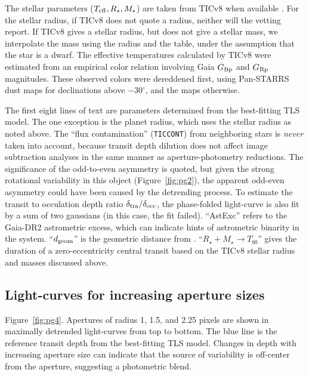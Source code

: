 \documentclass[12pt,twocolumn,tighten]{aastex62}
\begin{document}
The stellar parameters ($T_{\rm eff}, R_\star, M_\star$) are taken
from TICv8 when available \citep{stassun_TIC8_2019}.  For the stellar
radius, if TICv8 does not quote a radius, neither will the vetting
report.  If TICv8 gives a stellar radius, but does not give
a stellar mass, we interpolate the mass using the radius and the 
\citet{pecaut_intrinsic_2013}
table, under the assumption that the star is a dwarf.
The effective temperatures calculated by TICv8 were estimated from an empirical
color relation involving Gaia $G_{\rm Bp}$ and $G_{\rm Rp}$ magnitudes.  These
observed colors were dereddened first, using Pan-STARRS dust maps
\citep{green_galactic_2018} for declinations above $-30^\circ$, and the
\citet{schlegel_maps_1998} maps otherwise.

The first eight lines of text are parameters determined from the
best-fitting TLS model.  The one exception is the planet radius, which
uses the stellar radius as noted above.  The ``flux contamination''
(\texttt{TICCONT}) from neighboring stars is {\it never} taken into
account, because transit depth dilution does not affect image
subtraction analyses in the same manner as aperture-photometry
reductions.  The significance of the odd-to-even asymmetry is quoted,
but given the strong rotational variability in this object
(Figure~\ref{fig:pg2}), the apparent odd-even asymmetry could have
been caused by the detrending process.  To estimate the transit to
occulation depth ratio $\delta_{\rm tra}/\delta_{\rm occ}$, the
phase-folded light-curve is also fit by a sum of two gaussians (in
this case, the fit failed).  ``AstExc'' refers to the Gaia-DR2
astrometric excess, which can indicate hints of astrometric binarity
in the system.  ``$d_{\rm geom}$'' is the geometric distance from
\citet{bailer-jones_distances_2018}.  ``$R_\star + M_\star \rightarrow
T_{b0}$'' gives the duration of a zero-eccentricity central transit
based on the TICv8 stellar radius and masses discussed above.

\subsection{Light-curves for increasing aperture sizes}
\label{sec:pg4}

Figure~\ref{fig:pg4}.
Apertures of radius 1, 1.5, and 2.25 pixels are shown in maximally detrended
light-curves from top to
bottom.  The blue line is the reference transit depth from the
best-fitting TLS model.  Changes in depth with increasing aperture
size can indicate that the source of variability is off-center from
the aperture, suggesting a photometric blend.
\end{document}
